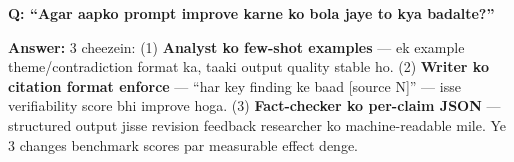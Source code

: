 \begin{interviewbox}
\textbf{Q: ``Agar aapko prompt improve karne ko bola jaye to kya badalte?''}

\textbf{Answer:} 3 cheezein: (1) \textbf{Analyst ko few-shot examples} --- ek example theme/contradiction format ka, taaki output quality stable ho. (2) \textbf{Writer ko citation format enforce} --- ``har key finding ke baad [source N]'' --- isse verifiability score bhi improve hoga. (3) \textbf{Fact-checker ko per-claim JSON} --- structured output jisse revision feedback researcher ko machine-readable mile. Ye 3 changes benchmark scores par measurable effect denge.
\end{interviewbox}
